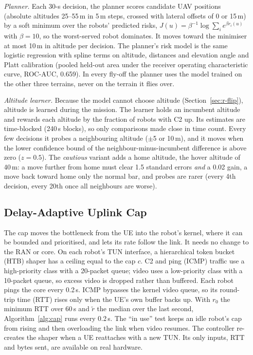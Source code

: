 \textit{Planner.} Each 30-s decision, the planner scores candidate UAV
positions (absolute altitudes 25--55\,m in 5\,m steps, crossed with lateral
offsets of 0 or 15\,m) by a soft minimum over the robots' predicted risks,
$J(u) = \beta^{-1}\log\sum_i e^{\beta r_i(u)}$ with $\beta = 10$, so the
worst-served robot dominates. It moves toward the minimiser at most 10\,m in
altitude per decision. The planner's risk model is the same logistic
regression with spline terms on altitude, distances and elevation angle and
Platt calibration (pooled held-out area under the receiver operating
characteristic curve, ROC-AUC, 0.659). In every fly-off the
planner uses the model trained on the other three terrains, never on the
terrain it flies over.

\textit{Altitude learner.} Because the model cannot choose altitude
(Section~\ref{sec:r-flip}), altitude is learned during the mission. The learner
holds an incumbent altitude and rewards each altitude by the fraction of robots
with C2 up. Its estimates are time-blocked (240\,s blocks), so only comparisons
made close in time count. Every few decisions it probes a neighbouring altitude
($\pm$5 or 10\,m), and it moves when the lower confidence bound of the
neighbour-minus-incumbent difference is above zero ($z = 0.5$). The
\emph{cautious} variant adds a home altitude, the hover altitude of 40\,m: a
move further from home must clear 1.5 standard errors \emph{and} a 0.02 gain,
a move back toward home only the normal bar, and probes are rarer (every 4th
decision, every 20th once all neighbours are worse).

\subsection{Delay-Adaptive Uplink Cap}
\label{sec:cap}
The cap moves the bottleneck from the UE into the robot's kernel, where it can
be bounded and prioritised, and lets its rate follow the link. It needs no
change to the RAN or core. On each robot's TUN interface, a hierarchical token bucket (HTB) shaper has a
ceiling equal to the cap $c$. C2 and ping (ICMP) traffic use a high-priority class with a
20-packet queue; video uses a low-priority class with a 10-packet queue, so
excess video is dropped rather than buffered. Each robot pings the core every
0.2\,s. ICMP bypasses the kernel video queue, so its round-trip time (RTT) rises only when the
UE's own buffer backs up. With $r_0$ the minimum RTT over 60\,s and $\tilde r$
the median over the last second, Algorithm~\ref{alg:cap} runs every 0.2\,s.
The ``in use'' test keeps an idle robot's cap from rising and then overloading
the link when video resumes. The controller re-creates the shaper when a UE
reattaches with a new TUN. Its only inputs, RTT and bytes sent, are available
on real hardware.

